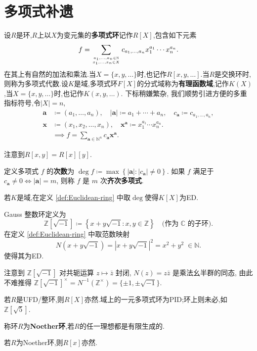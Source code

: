 \section{多项式补遗}
\begin{definition}
	设$R$是环,$R$上以$X$为变元集的\textbf{多项式环}记作$R[X]$,包含如下元素
	\[ f = \sum_{a_1, \ldots, a_n \in \mathbb{N}\atop x_1,\dots,x_n\in X} c_{a_1, \ldots, a_n} x_1^{a_1} \cdots x_n^{a_n}. \]
	在其上有自然的加法和乘法.当$X=\{x,y,\dots\}$时,也记作$R[x,y,\dots]$.当$R$是交换环时,则称为多项式代数.设$K$是域,多项式环$F[X]$的分式域称为\textbf{有理函数域},记作$K(X)$,当$X=\{x,y,\dots\}$时,也记作$K(x,y,\dots)$.
	下标稍嫌繁杂, 我们顺势引进方便的多重指标符号,令$|X|=n$,
	\begin{align*}
		\bm{a} & \coloneqq (a_1, \ldots, a_n),\quad |\bm{a}| \coloneqq a_1 + \cdots + a_n,\quad c_{\bm{a}} \coloneqq c_{a_1, \ldots, a_n}, \\
		\bm{x}& \coloneqq(x_1,x_2,\dots,x_n),\quad \bm{x}^{\bm{a}} \coloneqq x_1^{a_1} \cdots x_n^{a_n}.\\
		&\implies f=\sum_{\bm{a}\in \mathbb{N}^n} c_{\bm{a}} \bm{x}^{\bm{a}}.
	\end{align*}
	
	注意到$R[x,y]=R[x][y]$.
\end{definition}
\begin{definition}
	定义多项式 $f$ 的\textbf{次数}为 $\deg f \coloneqq \max\left\{ |\bm{a}| : |c_{\bm{a}}|\neq 0 \right\}$. 如果 $f$ 满足于 $c_{\bm{a}} \neq 0 \iff |\bm{a}|=m$, 则称 $f$ 是 $m$ 次\textbf{齐次多项式}.
\end{definition}
\begin{example}
	若$K$是域,在定义 \ref{def:Euclidean-ring} 中取$\deg$使得$K[X]$为ED.
\end{example}
\begin{example}\label{eg:Gauss-integers}
	Gauss 整数环定义为
	\[ \mathbb{Z}[\sqrt{-1}] \coloneqq \left\{ x+y\sqrt{-1} : x,y \in \mathbb{Z} \right\} \quad \text{(作为 $\mathbb{C}$ 的子环)}. \]
	在定义 \ref{def:Euclidean-ring} 中取范数映射
	\[ N(x+y\sqrt{-1}) = |x+y\sqrt{-1}|^2 = x^2 + y^2 \;\in \mathbb{N}. \]
	使得其为ED.
	
	
	注意到 $\mathbb{Z}[\sqrt{-1}]$ 对共轭运算 $z \mapsto \bar{z}$ 封闭, $N(z)=z\bar{z}$ 是乘法幺半群的同态, 由此不难推得 $\mathbb{Z}[\sqrt{-1}]^\times = N^{-1}(\mathbb{Z}^\times) = \{\pm 1, \pm\sqrt{-1}\}$.
\end{example}
\begin{proposition}
	若$R$是UFD/整环,则$R[X]$亦然.域上的一元多项式环为PID;环上则未必,如$\mathbb{Z}[\sqrt{5}].$
\end{proposition}
\begin{definition}
	称环$R$为\textbf{Noether环},若$R$的任一理想都是有限生成的.
\end{definition}
\begin{theorem}[Hilbert基定理]
	若$R$为Noether环,则$R[x]$亦然.
\end{theorem}

